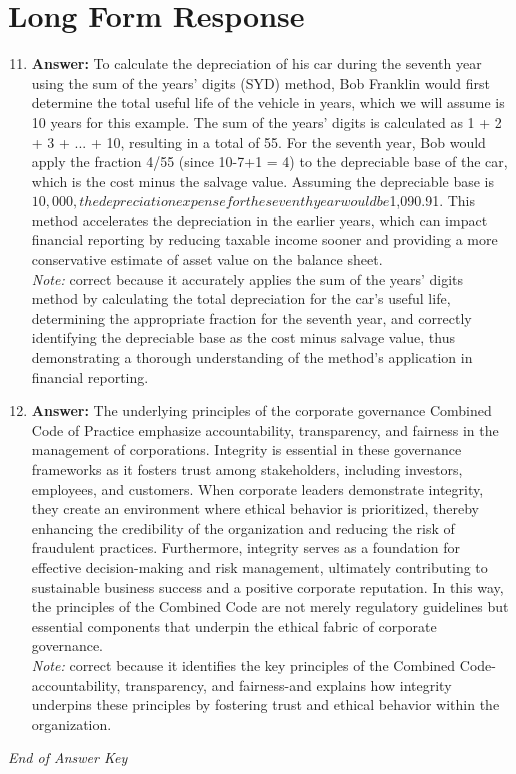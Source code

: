 \documentclass[12pt]{article}
\begin{document}
\section*{Long Form Response}
\begin{enumerate}[label=\arabic*.]
\setcounter{enumi}{10}
\item \textbf{Answer:} To calculate the depreciation of his car during the seventh year using the sum of the years' digits (SYD) method, Bob Franklin would first determine the total useful life of the vehicle in years, which we will assume is 10 years for this example. The sum of the years' digits is calculated as 1 + 2 + 3 + ... + 10, resulting in a total of 55. For the seventh year, Bob would apply the fraction 4/55 (since 10-7+1 = 4) to the depreciable base of the car, which is the cost minus the salvage value. Assuming the depreciable base is $10,000, the depreciation expense for the seventh year would be $1,090.91. This method accelerates the depreciation in the earlier years, which can impact financial reporting by reducing taxable income sooner and providing a more conservative estimate of asset value on the balance sheet.
\\ \textit{Note:} correct because it accurately applies the sum of the years' digits method by calculating the total depreciation for the car's useful life, determining the appropriate fraction for the seventh year, and correctly identifying the depreciable base as the cost minus salvage value, thus demonstrating a thorough understanding of the method's application in financial reporting.
\item \textbf{Answer:} The underlying principles of the corporate governance Combined Code of Practice emphasize accountability, transparency, and fairness in the management of corporations. Integrity is essential in these governance frameworks as it fosters trust among stakeholders, including investors, employees, and customers. When corporate leaders demonstrate integrity, they create an environment where ethical behavior is prioritized, thereby enhancing the credibility of the organization and reducing the risk of fraudulent practices. Furthermore, integrity serves as a foundation for effective decision-making and risk management, ultimately contributing to sustainable business success and a positive corporate reputation. In this way, the principles of the Combined Code are not merely regulatory guidelines but essential components that underpin the ethical fabric of corporate governance.
\\ \textit{Note:} correct because it identifies the key principles of the Combined Code-accountability, transparency, and fairness-and explains how integrity underpins these principles by fostering trust and ethical behavior within the organization.
\end{enumerate}

\vfill
\noindent\textit{End of Answer Key}
\end{document}

